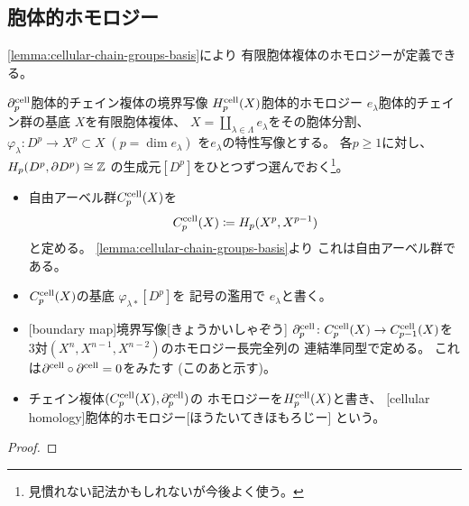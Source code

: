 \documentclass[report]{jlreq}
\begin{document}
\subsection{胞体的ホモロジー}

\cref{lemma:cellular-chain-groups-basis}により
有限胞体複体のホモロジーが定義できる。

\begin{definition}[胞体複体のホモロジー]
        {$\partial^{\mathrm{cell}}_p$}{胞体的チェイン複体の境界写像}
        {$H^{\mathrm{cell}}_p(X)$}{胞体的ホモロジー}
        {$e_\lambda$}{胞体的チェイン群の基底}
    $X$を有限胞体複体、
    $X = \coprod_{\lambda \in \Lambda} e_\lambda$をその胞体分割、
    $\varphi_\lambda \colon D^p \to X^p \subset X \; (p = \dim e_\lambda)$
    を$e_\lambda$の特性写像とする。
    各$p \ge 1$に対し、
    $H_p(D^p, \partial D^p) \cong \mathbb{Z}$
    の生成元$[D^p]$をひとつずつ選んでおく\footnote{
        見慣れない記法かもしれないが今後よく使う。
    }。
    \begin{itemize}
        \item 自由アーベル群$C_p^{\mathrm{cell}}(X)$を
            \begin{equation}
                C^{\mathrm{cell}}_p(X) \coloneqq H_p(X^p, X^{p - 1})
            \end{equation}
            と定める。
            \cref{lemma:cellular-chain-groups-basis}より
            これは自由アーベル群である。
        \item $C^{\mathrm{cell}}_p(X)$の基底
            $\varphi_{\lambda *} [D^p]$を
            記号の濫用で
            $e_\lambda$と書く。
        \item {}[boundary map]{境界写像}[きょうかいしゃぞう]
            $\partial^{\mathrm{cell}}_p \colon C^{\mathrm{cell}}_p(X) \to C^{\mathrm{cell}}_{p - 1}(X)$を
            3対$(X^n, X^{n - 1}, X^{n - 2})$のホモロジー長完全列の
            連結準同型で定める。
            これは$\partial^{\mathrm{cell}} \circ \partial^{\mathrm{cell}} = 0$をみたす (このあと示す)。
        \item チェイン複体$(C^{\mathrm{cell}}_p(X), \partial^{\mathrm{cell}}_p)$の
            ホモロジーを$H^{\mathrm{cell}}_p(X)$と書き、
            [cellular homology]{胞体的ホモロジー}[ほうたいてきほもろじー]
            という。
    \end{itemize}
\end{definition}

\begin{proof}
    \TODO{}
\end{proof}
\end{document}
